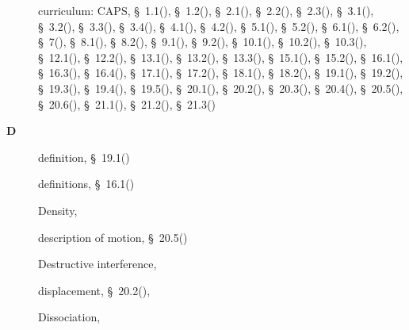 \begin{multicols}{2}
{\begin{description}
	  \item[] \noindent\raggedright curriculum: CAPS,  \S~1.1(\pageref{m38708}),  \S~1.2(\pageref{m38706}),  \S~2.1(\pageref{m38736}),  \S~2.2(\pageref{m38734}),  \S~2.3(\pageref{m38730}),  \S~3.1(\pageref{m38756}),  \S~3.2(\pageref{m38745}),  \S~3.3(\pageref{m38753}),  \S~3.4(\pageref{m38741}),  \S~4.1(\pageref{m38760}),  \S~4.2(\pageref{m38757}),  \S~5.1(\pageref{m38704}),  \S~5.2(\pageref{m38701}),  \S~6.1(\pageref{m38801}),  \S~6.2(\pageref{m38802}),  \S~7(\pageref{m38806}),  \S~8.1(\pageref{m38782}),  \S~8.2(\pageref{m38783}),  \S~9.1(\pageref{m38799}),  \S~9.2(\pageref{m38800}),  \S~10.1(\pageref{m38777}),  \S~10.2(\pageref{m38778}),  \S~10.3(\pageref{m38779}),  \S~12.1(\pageref{m38709}),  \S~12.2(\pageref{m38711}),  \S~13.1(\pageref{m38721}),  \S~13.2(\pageref{m38726}),  \S~13.3(\pageref{m38727}),  \S~15.1(\pageref{m38780}),  \S~15.2(\pageref{m38781}),  \S~16.1(\pageref{m38771}),  \S~16.3(\pageref{m38773}),  \S~16.4(\pageref{m38776}),  \S~17.1(\pageref{m38720}),  \S~17.2(\pageref{m38719}),  \S~18.1(\pageref{m38717}),  \S~18.2(\pageref{m38712}),  \S~19.1(\pageref{m38812}),  \S~19.2(\pageref{m38813}),  \S~19.3(\pageref{m38815}),  \S~19.4(\pageref{m38816}),  \S~19.5(\pageref{m38819}),  \S~20.1(\pageref{m38787}),  \S~20.2(\pageref{m38788}),  \S~20.3(\pageref{m38791}),  \S~20.4(\pageref{m38794}),  \S~20.5(\pageref{m38795}),  \S~20.6(\pageref{m38796}),  \S~21.1(\pageref{m38784}),  \S~21.2(\pageref{m38785}),  \S~21.3(\pageref{m38786})
	  \vspace{.3cm}
	  \item[{\large \bfseries D}]\noindent\raggedright
	  definition,  \S~19.1(\pageref{m38812})
	  
	  \item[] \noindent\raggedright definitions,  \S~16.1(\pageref{m38771})
	  
	  \item[] \noindent\raggedright Density,  \pageref{id2412522}
	  
	  \item[] \noindent\raggedright description of motion,  \S~20.5(\pageref{m38795})
	  
	  \item[] \noindent\raggedright Destructive interference,  \pageref{id2436357}
	  
	  \item[] \noindent\raggedright displacement,  \S~20.2(\pageref{m38788}),  \pageref{id2527121}
	  
	  \item[] \noindent\raggedright Dissociation,  \pageref{id2490327}
	  

\end{description}}
\end{multicols}
